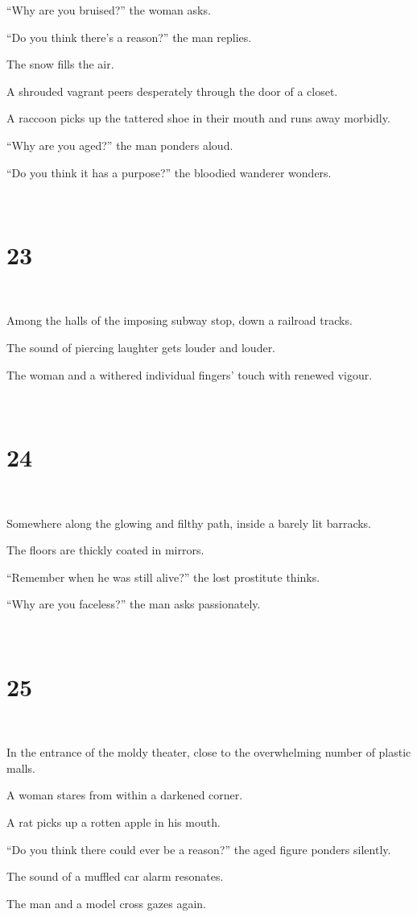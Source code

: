 \documentclass{report}
\begin{document}
``Why are you bruised?'' the woman asks.

``Do you think there's a reason?'' the man replies.

The snow fills the air.

A shrouded vagrant peers desperately through the door of a closet.

A raccoon picks up the tattered shoe in their mouth and runs away morbidly.

``Why are you aged?'' the man ponders aloud.

``Do you think it has a purpose?'' the bloodied wanderer wonders.

~
\chapter*{23}
~

Among the halls of the imposing subway stop, down a railroad tracks.

The sound of piercing laughter gets louder and louder.

The woman and a withered individual fingers' touch with renewed vigour.

~
\chapter*{24}
~

Somewhere along the glowing and filthy path, inside a barely lit barracks.

The floors are thickly coated in mirrors.

``Remember when he was still alive?'' the lost prostitute thinks.

``Why are you faceless?'' the man asks passionately.

~
\chapter*{25}
~

In the entrance of the moldy theater, close to the overwhelming number of plastic malls.

A woman stares from within a darkened corner.

A rat picks up a rotten apple in his mouth.

``Do you think there could ever be a reason?'' the aged figure ponders silently.

The sound of a muffled car alarm resonates.

The man and a model cross gazes again.
\end{document}
